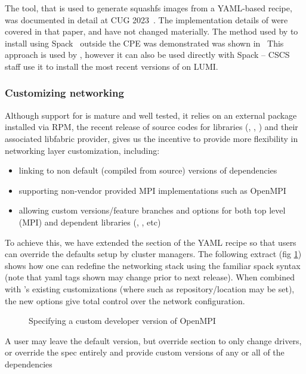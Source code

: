The  \stackinator tool, that is used to generate squashfs images from a YAML-based recipe, was documented in detail at CUG 2023~\cite{uenv2023}.
The implementation details of \stackinator were covered in that paper, and have not changed materially.
The method used by \stackinator to install \craympich using Spack~\cite{gamblin:sc15} outside the CPE was demonstrated was shown in~\cite{uenv2023}
This approach is used by \stackinator, however it can also be used directly with Spack -- CSCS staff use it to install the most recent versions of \craympich on LUMI.

\subsubsection{Customizing networking}
\label{sec:networking}
Although support for \craympich is mature and well tested, it relies on an external package installed via RPM,
the recent release of source codes for \slingshot libraries (, , ) and their associated libfabric  provider,
gives us the incentive to provide more flexibility in networking layer customization, including:
\begin{itemize}
    \item linking \craympich to non default (compiled from source) versions of \slingshot dependencies
    \item supporting non-vendor provided MPI implementations such as OpenMPI
    \item allowing custom versions/feature branches and options for both top level (MPI) and dependent libraries (, , etc)
\end{itemize}
To achieve this, we have extended the  section of the \stackinator YAML recipe so that users can override the defaults setup by cluster managers. The following extract (fig \ref{lst:openmpi-config}) shows how one can redefine the networking stack using the familiar spack syntax (note that yaml tags shown may change prior to next release). When combined with \stackinator's existing  customizations (where  such as  repository/location may be set), the new options give total control over the network configuration.
\begin{figure}[htp!]
    
    \caption{Specifying a custom developer version of OpenMPI}
    \label{lst:openmpi-config}
\end{figure}
A user may leave the default \craympich version, but override  section to only change drivers, or override the  spec entirely and provide custom versions of any or all of the dependencies

